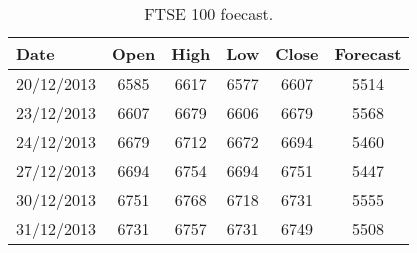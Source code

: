 \begin{table}[ht]
\centering
\caption[FTSE 100 foecast.]{FTSE 100 foecast.} 
\label{tab:chp_ts:ftse_100_fcast}
\begin{tabular}{lccccc}
  \toprule Date & Open & High & Low & Close & Forecast \\ 
  \midrule 20/12/2013 & 6585 & 6617 & 6577 & 6607 & 5514 \\ 
  23/12/2013 & 6607 & 6679 & 6606 & 6679 & 5568 \\ 
  24/12/2013 & 6679 & 6712 & 6672 & 6694 & 5460 \\ 
  27/12/2013 & 6694 & 6754 & 6694 & 6751 & 5447 \\ 
  30/12/2013 & 6751 & 6768 & 6718 & 6731 & 5555 \\ 
  31/12/2013 & 6731 & 6757 & 6731 & 6749 & 5508 \\ 
   \bottomrule \end{tabular}
\end{table}
